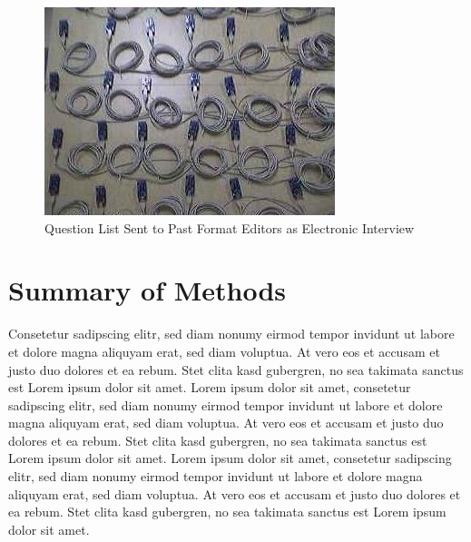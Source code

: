 \begin{figure}
\begin{center}
\includegraphics{testbed}
\caption{Question List Sent to Past Format Editors as Electronic Interview}
\end{center}
\end{figure}


\section{Summary of Methods}
Consetetur sadipscing elitr,  sed diam nonumy eirmod tempor invidunt ut labore
et dolore magna aliquyam erat, sed diam voluptua. At vero eos et accusam et
justo duo dolores et ea rebum. Stet clita kasd gubergren, no sea takimata
sanctus est Lorem ipsum dolor sit amet. Lorem ipsum dolor sit amet, consetetur
sadipscing elitr,  sed diam nonumy eirmod tempor invidunt ut labore et dolore
magna aliquyam erat, sed diam voluptua. At vero eos et accusam et justo duo
dolores et ea rebum. Stet clita kasd gubergren, no sea takimata sanctus est
Lorem ipsum dolor sit amet. Lorem ipsum dolor sit amet, consetetur sadipscing
elitr,  sed diam nonumy eirmod tempor invidunt ut labore et dolore magna
aliquyam erat, sed diam voluptua. At vero eos et accusam et justo duo dolores
et ea rebum. Stet clita kasd gubergren, no sea takimata sanctus est Lorem ipsum
dolor sit amet.

